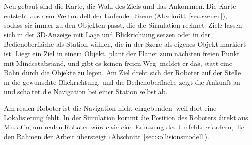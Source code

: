 Neu gebaut sind die Karte, die Wahl des Ziels und das Ankommen.
Die Karte entsteht aus dem Weltmodell der laufenden Szene (Abschnitt~\ref{sec:szenen}), sodass sie immer zu den Objekten passt, die die Simulation rechnet.
Ziele lassen sich in der 3D-Anzeige mit Lage und Blickrichtung setzen oder in der Bedienoberfläche als Station wählen, die in der Szene als eigenes Objekt markiert ist.
Liegt ein Ziel in einem Objekt, plant der Planer zum nächsten freien Punkt mit Mindestabstand, und gibt es keinen freien Weg, meldet er das, statt eine Bahn durch die Objekte zu legen.
Am Ziel dreht sich der Roboter auf der Stelle in die gewünschte Blickrichtung, und die Bedienoberfläche zeigt die Ankunft an und schaltet die Navigation bei einer Station selbst ab.

Am realen Roboter ist die Navigation nicht eingebunden, weil dort eine Lokalisierung fehlt.
In der Simulation kommt die Position des Roboters direkt aus MuJoCo, am realen Roboter würde sie eine Erfassung des Umfelds erfordern, die den Rahmen der Arbeit übersteigt (Abschnitt~\ref{sec:kollisionsmodell}).
